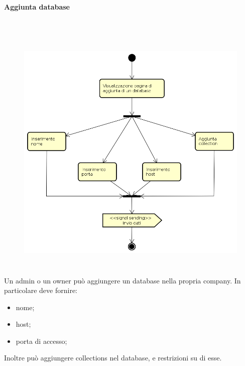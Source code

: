 \paragraph{Aggiunta database} \mbox{} \\
\begin{figure}[H]
\begin{center}
\includegraphics[height=12cm]{res/sections/backend/activities/aggiuntaDatabase.png}
\end{center}
\end{figure}
Un admin o un owner può aggiungere un database nella propria company. In particolare deve fornire:
\begin{itemize}
\item nome;
\item host;
\item porta di accesso;
\end{itemize}
Inoltre può aggiungere collections nel database, e restrizioni su di esse.
